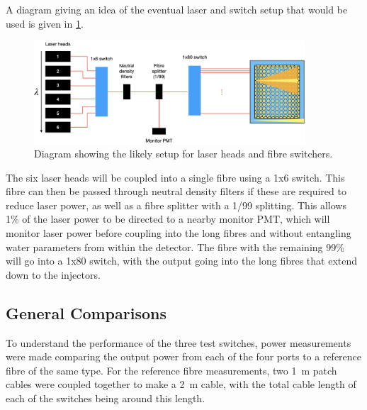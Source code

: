\documentclass[a4paper,11pt]{article}
\begin{document}
A diagram giving an idea of the eventual laser and switch setup that would be used is given in \cref{fig:laserswitches}.
\begin{figure}[h]
\centering
\includegraphics[width=0.9\textwidth]{switchConfiguration}
\caption{Diagram showing the likely setup for laser heads and fibre switchers.}\label{fig:laserswitches}
\end{figure}
The six laser heads will be coupled into a single fibre using a 1x6 switch. This fibre can then be passed through neutral density filters if these are required to reduce laser power, as well as a fibre splitter with a 1/99 splitting. This allows 1\% of the laser power to be directed to a nearby monitor PMT, which will monitor laser power before coupling into the long fibres and without entangling water parameters from within the detector. The fibre with the remaining 99\% will go into a 1x80 switch, with the output going into the long fibres that extend down to the injectors.

\subsection{General Comparisons}

To understand the performance of the three test switches, power measurements were made comparing the output power from each of the four ports to a reference fibre of the same type. For the reference fibre measurements, two 1~m patch cables were coupled together to make a 2~m cable, with the total cable length of each of the switches being around this length.
\end{document}
